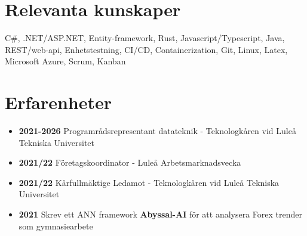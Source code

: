 \documentclass[a4paper]{article}
\begin{document}
\section{Relevanta kunskaper}
    C\#, .NET/ASP.NET, Entity-framework, Rust, Javascript/Typescript, Java, REST/web-api,
    Enhetstestning, CI/CD, Containerization, Git, Linux, Latex, Microsoft Azure, Scrum,
    Kanban

\section{Erfarenheter}

    \begin{itemize}
        \item {\textbf{2021-2026} Programrådsrepresentant datateknik - Teknologkåren vid Luleå Tekniska Universitet}
        \item {\textbf{2021/22} Företagskoordinator - Luleå Arbetsmarknadsvecka}
        \item {\textbf{2021/22} Kårfullmäktige Ledamot - Teknologkåren vid Luleå Tekniska Universitet}
        \item {\textbf{2021} Skrev ett ANN framework \textbf{Abyssal-AI} för att analysera Forex trender som gymnasiearbete}
        
    \end{itemize}
\end{document}
